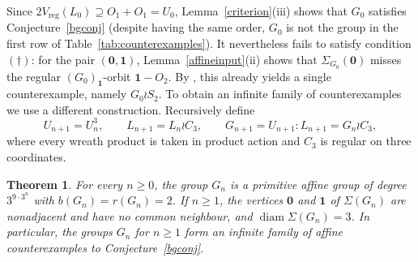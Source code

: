 \documentclass[a4paper,reqno,11pt]{amsart}
\newcommand\diam{\operatorname{diam}}
\newtheorem{thm}{Theorem}[section]
\numberwithin{equation}{section}
\begin{document}
Since $2V_{\mathrm{reg}}(L_0)\supseteq O_1+O_1=U_0$, Lemma~\ref{criterion}(iii) shows that $G_0$ satisfies Conjecture~\ref{bgconj} (despite having the same order, $G_0$ is not the group in the first row of Table~\ref{tab:counterexamples}). It nevertheless fails to satisfy condition $(\dagger)$: for the pair $(\mathbf0,\mathbf1)$, Lemma~\ref{affineinput}(ii) shows that $\Sigma_{G_0}(\mathbf0)$ misses the regular $(G_0)_{\mathbf1}$-orbit $\mathbf1-O_2$. By \cite[Corollary~5.7 and Proposition~5.9]{BH}, this already yields a single counterexample, namely $G_0\wr S_2$. To obtain an infinite family of counterexamples we use a different construction. Recursively define
\begin{equation}\label{eq:tower}
U_{n+1}=U_n^3,\qquad
L_{n+1}=L_n\wr C_3,\qquad
G_{n+1}=U_{n+1}{:}L_{n+1}=G_n\wr C_3,
\end{equation}
where every wreath product is taken in product action and $C_3$ is regular on three coordinates.

\begin{thm}\label{thm:affine}
For every $n\ge0$, the group $G_n$ is a primitive affine group of degree $3^{9\cdot3^n}$ with $b(G_n)=r(G_n)=2$. If $n\ge1$, the vertices $\mathbf0$ and $\mathbf1$ of $\Sigma(G_n)$ are nonadjacent and have no common neighbour, and $\diam\Sigma(G_n)=3$. In particular, the groups $G_n$ for $n\ge1$ form an infinite family of affine counterexamples to Conjecture~\ref{bgconj}.
\end{thm}
\end{document}
